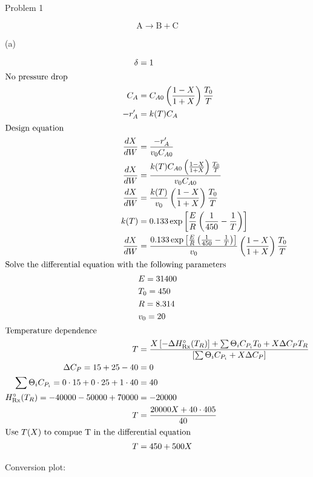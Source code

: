 \item Problem 1

\[
    \mathrm{A} \rightarrow \mathrm{B} + \mathrm{C}
\]

(a)

\begin{align*}
    \delta &= 1 \\
    \intertext{No pressure drop}
    C_A &= C_{A0} \left(\frac{1 - X}{1 + X}\right) \frac{T_0}{T} \\
    -r_A' &= k(T) C_A \\
    \intertext{Design equation}
    \frac{dX}{dW} &= \frac{-r_A'}{v_0 C_{A0}} \\
    \frac{dX}{dW} &= \frac{k(T) C_{A0} \left(\frac{1 - X}{1 + X}\right) \frac{T_0}{T}}{v_0 C_{A0}} \\
    \frac{dX}{dW} &= \frac{k(T)}{v_0} \left(\frac{1 - X}{1 + X}\right) \frac{T_0}{T} \\
    k(T) &= 0.133 \exp\left[\frac{E}{R}\left(\frac{1}{450} - \frac{1}{T}\right)\right] \\
    \frac{dX}{dW} &= \frac{0.133 \exp\left[\frac{E}{R}\left(\frac{1}{450} - \frac{1}{T}\right)\right]}{v_0} \left(\frac{1 - X}{1 + X}\right) \frac{T_0}{T} \\
    \intertext{Solve the differential equation with the following parameters}
    & E = 31400 \\
    & T_0 = 450 \\
    & R = 8.314 \\
    & v_0 = 20 \\
    \intertext{Temperature dependence}
    T &= \frac{X \left[-\Delta H_{\text{Rx}}^\circ(T_R)\right] + \sum\Theta_iC_{P_i}T_0 + X\Delta C_P T_R}{\left[\sum\Theta_iC_{P_i} +  X\Delta C_P\right]} \\
    \Delta C_P = 15 + 25 - 40 &= 0 \\
    \sum\Theta_iC_{P_i} = 0 \cdot 15 + 0 \cdot 25 + 1 \cdot 40 &= 40 \\
    H_{\text{Rx}}^\circ(T_R) = -40000 - 50000 + 70000 &= -20000 \\
    T &= \frac{20000X + 40 \cdot 405}{40} \\
    \intertext{Use $T(X)$ to compue T in the differential equation}
    T &= 450 + 500X
\end{align*}

Conversion plot:

\begin{center}
    
\end{center}

